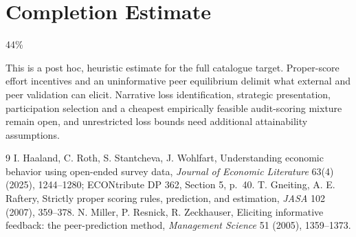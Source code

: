 \documentclass[11pt]{article}
\theoremstyle{definition}
\begin{document}
\section{Completion Estimate}
44\%

This is a post hoc, heuristic estimate for the full catalogue target.
Proper-score effort incentives and an uninformative peer equilibrium delimit what external and peer validation can elicit. Narrative loss identification, strategic presentation, participation selection and a cheapest empirically feasible audit-scoring mixture remain open, and unrestricted loss bounds need additional attainability assumptions.

\begin{thebibliography}{9}
 I. Haaland, C. Roth, S. Stantcheva, J. Wohlfart, Understanding economic behavior using open-ended survey data,
\emph{Journal of Economic Literature} 63(4) (2025), 1244--1280; ECONtribute DP 362, Section 5, p.~40.
 T. Gneiting, A. E. Raftery, Strictly proper scoring rules, prediction, and estimation, \emph{JASA} 102 (2007), 359--378.
 N. Miller, P. Resnick, R. Zeckhauser, Eliciting informative feedback: the peer-prediction method,
\emph{Management Science} 51 (2005), 1359--1373.
\end{thebibliography}
\end{document}
